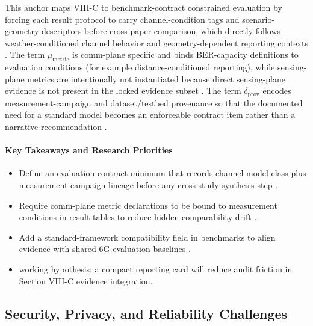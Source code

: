 \documentclass[lettersize,journal]{IEEEtran}
\begin{document}
This anchor maps VIII-C to benchmark-contract constrained evaluation by forcing each result protocol to carry channel-condition tags and scenario-geometry descriptors before cross-paper comparison, which directly follows weather-conditioned channel behavior and geometry-dependent reporting contexts \cite{O_ISAC_005, O_ISAC_327}. The term $\mu_{\mathrm{metric}}$ is comm-plane specific and binds BER-capacity definitions to evaluation conditions (for example distance-conditioned reporting), while sensing-plane metrics are intentionally not instantiated because direct sensing-plane evidence is not present in the locked evidence subset \cite{O_ISAC_381}. The term $\delta_{\mathrm{prov}}$ encodes measurement-campaign and dataset/testbed provenance so that the documented need for a standard model becomes an enforceable contract item rather than a narrative recommendation \cite{O_ISAC_327}.

\paragraph{Key Takeaways and Research Priorities}
\begin{itemize}
    \item Define an evaluation-contract minimum that records channel-model class plus measurement-campaign lineage before any cross-study synthesis step \cite{O_ISAC_327}.
    \item Require comm-plane metric declarations to be bound to measurement conditions in result tables to reduce hidden comparability drift \cite{O_ISAC_381}.
    \item Add a standard-framework compatibility field in benchmarks to align evidence with shared 6G evaluation baselines \cite{O_ISAC_327}.
    \item working hypothesis: a compact reporting card will reduce audit friction in Section VIII-C evidence integration.
\end{itemize}

\subsection{Security, Privacy, and Reliability Challenges}
\end{document}
